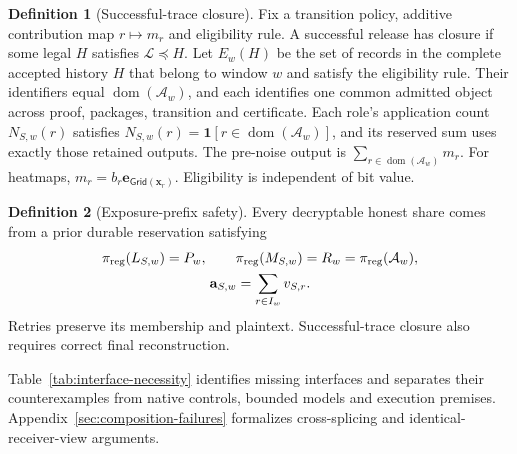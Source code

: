 \documentclass[conference,compsoc]{IEEEtran}
\theoremstyle{definition}
\newtheorem{definition}{Definition}[section]
\newtheorem{definition}{Definition}
\numberwithin{equation}{section}
\numberwithin{table}{section}
\numberwithin{figure}{section}
\theoremstyle{plain}
\begin{document}
\begin{definition}[Successful-trace closure]
\label{def:trace-closure}
Fix a transition policy, additive contribution map \(r\mapsto m_r\) and
eligibility rule. A successful release has closure if some legal \(H\)
satisfies \(\mathcal L\preceq H\). Let \(E_w(H)\) be the set of records in
the complete accepted history \(H\) that belong to window \(w\) and satisfy
the eligibility rule. Their identifiers equal \(\operatorname{dom}(\mathcal A_w)\),
and each identifies one common admitted object across proof, packages,
transition and certificate. Each role's application count \(N_{S,w}(r)\) satisfies
\(N_{S,w}(r)=\mathbf1[r\in\operatorname{dom}(\mathcal A_w)]\), and its reserved sum uses exactly
those retained outputs. The pre-noise output is
\(\sum_{r\in\operatorname{dom}(\mathcal A_w)}m_r\). For heatmaps,
\(m_r=b_r\mathbf e_{\mathsf{Grid}(\mathbf x_r)}\). Eligibility is independent
of bit value.
\end{definition}

\begin{definition}[Exposure-prefix safety]
\label{def:exposure-prefix}
Every decryptable honest share comes from a prior durable reservation
satisfying
\begin{equation}
 \begin{gathered}
 \pi_{\rm reg}(L_{S,w})=P_w,\qquad
 \pi_{\rm reg}(M_{S,w})=R_w=\pi_{\rm reg}(\mathcal A_w),\\
 \mathbf a_{S,w}=\sum_{r\in I_w}v_{S,r}.
 \end{gathered}
 \label{eq:export-safety}
\end{equation}
Retries preserve its membership and plaintext. Successful-trace closure also
requires correct final reconstruction.
\end{definition}

\label{prop:rectangularity-main}
\label{thm:interface-separation-main}
\label{sec:interface-necessity}
Table~\ref{tab:interface-necessity} identifies missing interfaces and separates
their counterexamples from native controls, bounded models and execution
premises. Appendix~\ref{sec:composition-failures} formalizes cross-splicing
and identical-receiver-view arguments.
\end{document}
